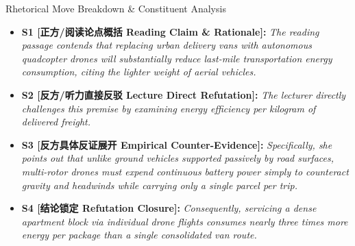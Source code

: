 \begin{TipBox}{Rhetorical Move Breakdown \& Constituent Analysis}
\begin{itemize}[leftmargin=1.5em]
  \item \textbf{S1 [正方/阅读论点概括 Reading Claim \& Rationale]:} \textit{The reading passage contends that replacing urban delivery vans with autonomous quadcopter drones will substantially reduce last-mile transportation energy consumption, citing the lighter weight of aerial vehicles.}\par{}
  \item \textbf{S2 [反方/听力直接反驳 Lecture Direct Refutation]:} \textit{The lecturer directly challenges this premise by examining energy efficiency per kilogram of delivered freight.}\par{}
  \item \textbf{S3 [反方具体反证展开 Empirical Counter-Evidence]:} \textit{Specifically, she points out that unlike ground vehicles supported passively by road surfaces, multi-rotor drones must expend continuous battery power simply to counteract gravity and headwinds while carrying only a single parcel per trip.}\par{}
  \item \textbf{S4 [结论锁定 Refutation Closure]:} \textit{Consequently, servicing a dense apartment block via individual drone flights consumes nearly three times more energy per package than a single consolidated van route.}\par{}
\end{itemize}
\end{TipBox}
\medskip
